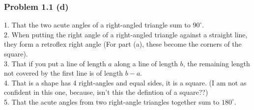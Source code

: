 \documentclass{article}
\begin{document}
\subsubsection{Problem 1.1 (d)}
1. That the two acute angles of a right-angled triangle sum to $90^{\circ}$.\\
2. When putting the right angle of a right-angled triangle against a straight line, they form a retroflex right angle (For part (a), these become the corners of the square).\\
3. That if you put a line of length $a$ along a line of length $b$, the remaining length not covered by the first line is of length $b-a$.\\
4. That is a shape has 4 right-angles and equal sides, it is a square. (I am not as confident in this one, because, isn't this the defintion of a square??)\\
5. That the acute angles from two right-angle triangles together sum to $180^{\circ}$.
\end{document}
